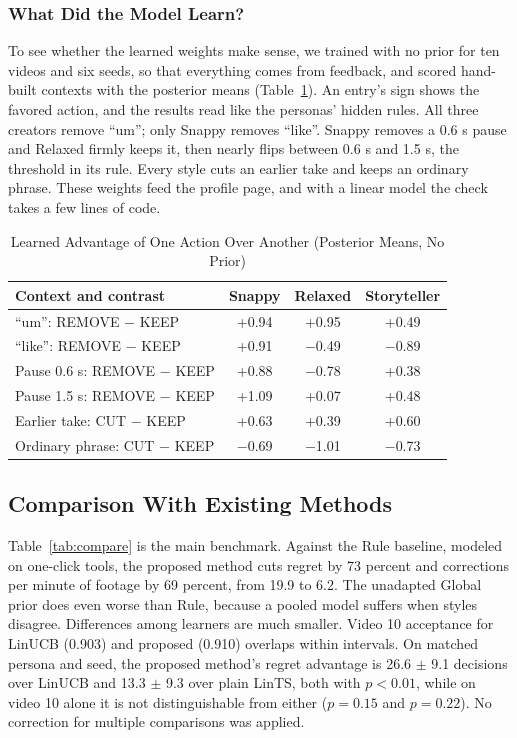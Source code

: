 \documentclass{ieeeaccess}
\begin{document}
\subsubsection{What Did the Model Learn?}
To see whether the learned weights make sense, we trained with no prior for ten videos and six seeds, so that everything comes from feedback, and scored hand-built contexts with the posterior means (Table~\ref{tab:learned}). An entry's sign shows the favored action, and the results read like the personas' hidden rules. All three creators remove ``um''; only Snappy removes ``like''. Snappy removes a 0.6 s pause and Relaxed firmly keeps it, then nearly flips between 0.6 s and 1.5 s, the threshold in its rule. Every style cuts an earlier take and keeps an ordinary phrase. These weights feed the profile page, and with a linear model the check takes a few lines of code.

\begin{table}[t]
\caption{Learned Advantage of One Action Over Another (Posterior Means, No Prior)}
\label{tab:learned}
\setlength{\tabcolsep}{3pt}
\centering
\begin{tabular}{|l|c|c|c|}
\hline
Context and contrast & Snappy & Relaxed & Storyteller \\
\hline
``um'': REMOVE $-$ KEEP & +0.94 & +0.95 & +0.49 \\
``like'': REMOVE $-$ KEEP & +0.91 & $-$0.49 & $-$0.89 \\
Pause 0.6 s: REMOVE $-$ KEEP & +0.88 & $-$0.78 & +0.38 \\
Pause 1.5 s: REMOVE $-$ KEEP & +1.09 & +0.07 & +0.48 \\
Earlier take: CUT $-$ KEEP & +0.63 & +0.39 & +0.60 \\
Ordinary phrase: CUT $-$ KEEP & $-$0.69 & $-$1.01 & $-$0.73 \\
\hline
\end{tabular}
\end{table}

\subsection{Comparison With Existing Methods}
Table~\ref{tab:compare} is the main benchmark. Against the Rule baseline, modeled on one-click tools, the proposed method cuts regret by 73 percent and corrections per minute of footage by 69 percent, from 19.9 to 6.2. The unadapted Global prior does even worse than Rule, because a pooled model suffers when styles disagree. Differences among learners are much smaller. Video 10 acceptance for LinUCB (0.903) and proposed (0.910) overlaps within intervals. On matched persona and seed, the proposed method's regret advantage is 26.6 $\pm$ 9.1 decisions over LinUCB and 13.3 $\pm$ 9.3 over plain LinTS, both with $p<0.01$, while on video 10 alone it is not distinguishable from either ($p=0.15$ and $p=0.22$). No correction for multiple comparisons was applied.
\end{document}
